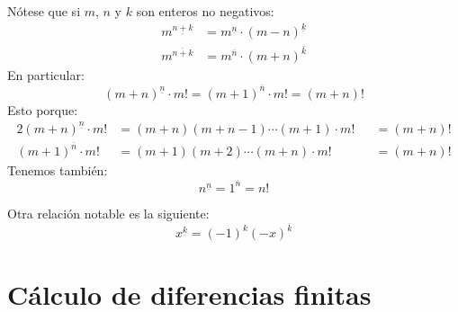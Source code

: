   Nótese que si \(m\), \(n\) y \(k\) son enteros no negativos:
  \begin{align}
    m^{\underline{n + k}}
      &= m^{\underline{n}} \cdot (m - n)^{\underline{k}}
	  \label{eq:potencia-factorial-bajada-suma} \\
    m^{\overline{n + k}}
      &= m^{\overline{n}} \cdot (m + n)^{\overline{k}}
	  \label{eq:potencia-factorial-subida-suma}
  \end{align}
  En particular:
  \begin{equation}
    \label{eq:factorial-potencia-factorial}
    (m + n)^{\underline{n}} \cdot m!
      = (m + 1)^{\overline{n}} \cdot m!
      = (m + n)!
  \end{equation}
  Esto porque:
  \begin{alignat*}{2}
    (m + n)^{\underline{n}} \cdot m!
      &= (m + n) (m + n - 1) \dotsm (m + 1) \cdot m!
      &&= (m + n)! \\
    (m + 1)^{\overline{n}} \cdot m!
      &= (m + 1) (m + 2) \dotsm (m + n) \cdot m!
      &&= (m + n)!
  \end{alignat*}
  Tenemos también:
  \begin{equation}
    \label{eq:factorial=potencia-factorial}
    n^{\underline{n}} = 1^{\overline{n}} = n!
  \end{equation}

  Otra relación notable es la siguiente:
  \begin{equation}
    \label{eq:potencia-factorial-negativo}
    x^{\underline{k}}
      = (-1)^k (-x)^{\overline{k}}
  \end{equation}

\section{Cálculo de diferencias finitas}
\label{sec:finite-differences}

